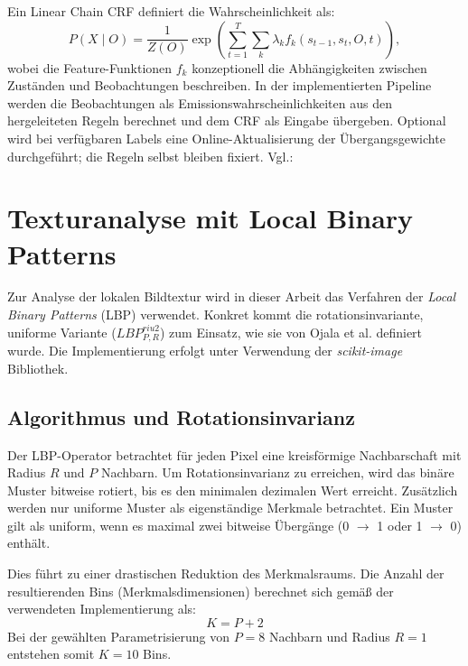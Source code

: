 Ein Linear Chain CRF definiert die Wahrscheinlichkeit als:
\begin{equation}
    P(X \mid O) = \frac{1}{Z(O)} \exp \left( \sum_{t=1}^{T} \sum_{k} \lambda_k f_k(s_{t-1}, s_t, O, t) \right),
\end{equation}
wobei die Feature-Funktionen $f_k$ konzeptionell die Abhängigkeiten zwischen Zuständen und Beobachtungen beschreiben. In der implementierten Pipeline werden die Beobachtungen als Emissionswahrscheinlichkeiten aus den hergeleiteten Regeln berechnet und dem CRF als Eingabe übergeben. Optional wird bei verfügbaren Labels eine Online-Aktualisierung der Übergangsgewichte durchgeführt; die Regeln selbst bleiben fixiert. Vgl.:\ \cite{10.5555/645530.655813}

\section{Texturanalyse mit Local Binary Patterns}

Zur Analyse der lokalen Bildtextur wird in dieser Arbeit das Verfahren der \textit{Local Binary Patterns} (LBP) verwendet. Konkret kommt die rotationsinvariante, uniforme Variante ($LBP_{P,R}^{riu2}$) zum Einsatz, wie sie von Ojala et al. \cite{Ojala2002} definiert wurde. Die Implementierung erfolgt unter Verwendung der \textit{scikit-image} Bibliothek.

\subsection{Algorithmus und Rotationsinvarianz}
Der LBP-Operator betrachtet für jeden Pixel eine kreisförmige Nachbarschaft mit Radius $R$ und $P$ Nachbarn. Um Rotationsinvarianz zu erreichen, wird das binäre Muster bitweise rotiert, bis es den minimalen dezimalen Wert erreicht. Zusätzlich werden nur uniforme Muster als eigenständige Merkmale betrachtet. Ein Muster gilt als uniform, wenn es maximal zwei bitweise Übergänge (0 $\rightarrow$ 1 oder 1 $\rightarrow$ 0) enthält. \cite{scikit-image}

Dies führt zu einer drastischen Reduktion des Merkmalsraums. Die Anzahl der resultierenden Bins (Merkmalsdimensionen) berechnet sich gemäß der verwendeten Implementierung als:
\begin{equation}
    K = P + 2
\end{equation}
Bei der gewählten Parametrisierung von $P=8$ Nachbarn und Radius $R=1$ entstehen somit $K=10$ Bins.

